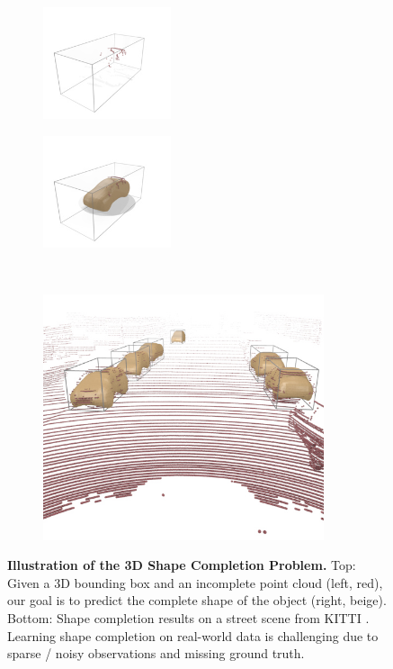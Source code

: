\begin{figure}
    \centering
    \vspace*{-0.5cm}
    \begin{subfigure}[t]{0.20\textwidth}
        \includegraphics[width=3.75cm,trim={0.5cm 0 1cm 0.75cm},clip]{gfx/overview_small/points/00017}
    \end{subfigure}
    \begin{subfigure}[t]{0.20\textwidth}
        \includegraphics[width=3.75cm,trim={0.5cm 0 1cm 0.75cm},clip]{gfx/overview_small/sdf_points/00017}
    \end{subfigure}\\[-0.1cm]
    \begin{subfigure}[t]{0.5\textwidth}
        \includegraphics[width=8.25cm,trim={0 8cm 0cm 2cm},clip]{gfx/overview_small/00000}
    \end{subfigure}
    \caption{{\bf Illustration of the 3D Shape Completion Problem.}
    Top: Given a 3D bounding box and an incomplete point cloud (left, {\color{rred}red}), our goal is to predict the complete shape of the object (right, {\color{rbeige}beige}).
    Bottom: Shape completion results on a street scene from KITTI \cite{Geiger2012CVPR}.
    Learning shape completion on real-world data is challenging due to sparse / noisy observations and missing ground truth.}
    \label{fig:introduction}
    \vspace*{-0.25cm}
\end{figure}